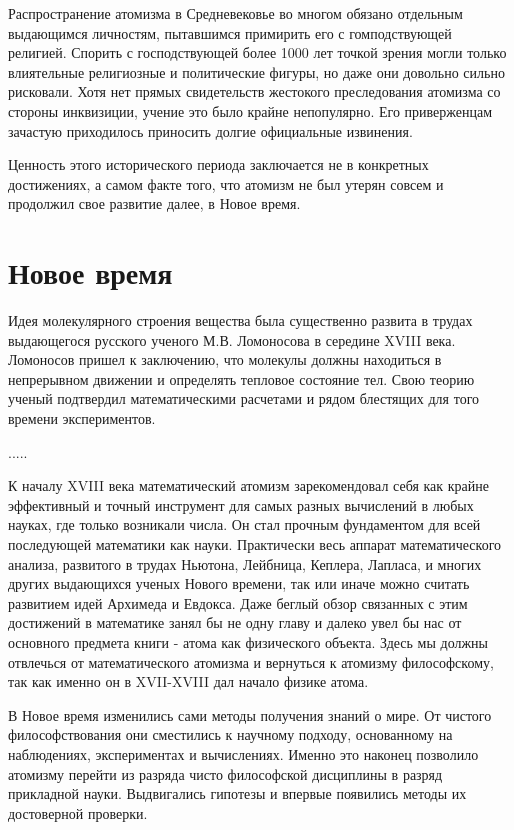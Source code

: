 Распространение атомизма в Средневековье во многом обязано отдельным выдающимся личностям, пытавшимся примирить его с гомподствующей религией.
Спорить с господствующей более 1000 лет точкой зрения могли только влиятельные религиозные и политические фигуры, но даже они довольно сильно рисковали.
Хотя нет прямых свидетельств жестокого преследования атомизма со стороны инквизиции, учение это было крайне непопулярно.
Его приверженцам зачастую приходилось приносить долгие официальные извинения.

Ценность этого исторического периода заключается не в конкретных достижениях, а самом факте того, что атомизм не был утерян совсем и продолжил свое развитие далее, в Новое время.


\section*{Новое время}

Идея молекулярного строения вещества была существенно развита в трудах выдающегося русского ученого М.В. Ломоносова в середине XVIII века.
Ломоносов пришел к заключению, что молекулы должны находиться в непрерывном движении и определять тепловое состояние тел.
Свою теорию ученый подтвердил математическими расчетами и рядом блестящих для того времени экспериментов.

.....




К началу XVIII века математический атомизм зарекомендовал себя как крайне эффективный и точный инструмент для самых разных вычислений в любых науках, где только возникали числа. 
Он стал прочным фундаментом для всей последующей математики как науки.
Практически весь аппарат математического анализа, развитого в трудах Ньютона, Лейбница, Кеплера, Лапласа, и многих других выдающихся ученых Нового времени, так или иначе можно считать развитием идей Архимеда и Евдокса.
Даже беглый обзор связанных с этим достижений в математике занял бы не одну главу и далеко увел бы нас от основного предмета книги - атома как физического объекта.
Здесь мы должны отвлечься от математического атомизма и вернуться к атомизму философскому, так как именно он в XVII-XVIII дал начало физике атома.


В Новое время изменились сами методы получения знаний о мире.
От чистого философствования они сместились к научному подходу, основанному на наблюдениях, экспериментах и вычислениях.
Именно это наконец позволило атомизму перейти из разряда чисто философской дисциплины в разряд прикладной науки. Выдвигались гипотезы и впервые появились методы их достоверной проверки.


